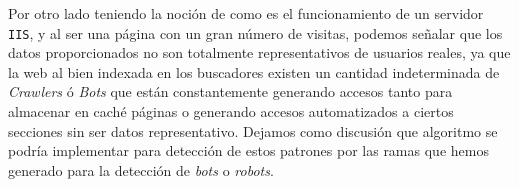 \begin{enumerate}
	
	
	Por otro lado teniendo la noción de como es el funcionamiento de un servidor \texttt{IIS}, y al ser una página con un gran número de visitas, podemos señalar que los datos proporcionados no son totalmente representativos de usuarios reales, ya que la web al bien indexada en los buscadores existen un cantidad indeterminada de \emph{Crawlers} ó \emph{Bots} que están constantemente generando accesos tanto para almacenar en caché páginas o generando accesos automatizados a ciertos secciones sin ser datos representativo. Dejamos como discusión que algoritmo se podría implementar para detección de estos patrones por las ramas que hemos generado para la detección de \emph{bots} o \emph{robots}.
	
	
	
	
	 
	
\end{enumerate}








 






